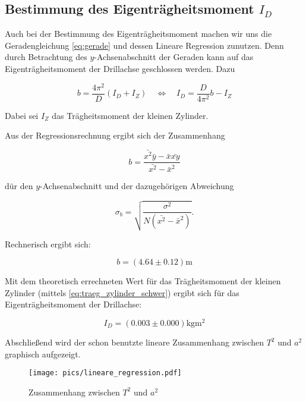 \subsection{Bestimmung des Eigenträgheitsmoment $I_D$}

Auch bei der Bestimmung des Eigenträgheitsmoment machen wir uns die 
Geradengleichung \eqref{eq:gerade} und dessen Lineare Regression zunutzen.
Denn durch Betrachtung des $y$-Achsenabschnitt der Geraden kann auf das Eigenträgheitsmoment der Drillachse geschlossen werden.
Dazu

\begin{equation*}
b=\frac{4\pi^2}{D}\left(I_D+I_Z\right) \quad \Leftrightarrow \quad I_D=\frac{D}{4\pi^2}b-I_Z
\end{equation*}

Dabei sei $I_Z$ das Trägheitsmoment der kleinen Zylinder.%

Aus der Regressionsrechnung ergibt sich der Zusammenhang

\begin{equation*}
b=\frac{\bar{x^2}\bar{y}-\bar{x}\bar{xy}}{\bar{x^2}-\bar{x}^2}
\end{equation*}

dür den $y$-Achsenabschnitt und der dazugehörigen Abweichung

\begin{equation*}
\sigma_b=\sqrt{\frac{\sigma^2}{N\left(\bar{x^2}-\bar{x}^2\right)}}.
\end{equation*}

Rechnerisch ergibt sich:

\begin{equation}
\label{eq:y_achsenabschnitt}
b=\left(\num{4.64}\pm\num{0.12}\right) \si{\meter}
\end{equation}

Mit dem theoretisch errechneten Wert für das Trägheitsmoment der kleinen Zylinder (mittels \eqref{eq:traeg_zylinder_schwer}) ergibt sich für das 
Eigenträgheitsmoment der Drillachse:

\begin{equation}
\label{eq:eigentraegheitsmoment}
I_D=\left(\num{0.003}\pm\num{0.000}\right) \si{\kilogram\meter\squared}
\end{equation}


Abschließend wird der schon benutzte lineare Zusammenhang zwischen $T^2$ und $a^2$ graphisch aufgezeigt.

\begin{figure}
  \centering
  \texttt{[image: pics/lineare\_regression.pdf]}
  \caption{Zusammenhang zwischen $T^2$ und $a^2$}
  \label{fig:zusammenhang_a_T}
\end{figure}


